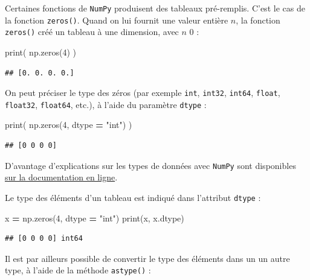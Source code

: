 \documentclass[12pt,]{book}
\newenvironment{Shaded}{\begin{snugshade}}{\end{snugshade}}
\newcommand{\DecValTok}[1]{\textcolor[rgb]{0.00,0.00,0.81}{#1}}
\newcommand{\StringTok}[1]{\textcolor[rgb]{0.31,0.60,0.02}{#1}}
\newcommand{\OperatorTok}[1]{\textcolor[rgb]{0.81,0.36,0.00}{\textbf{#1}}}
\newcommand{\BuiltInTok}[1]{#1}
\newcommand{\NormalTok}[1]{#1}
\numberwithin{equation}{section}
\numberwithin{countremarque}{section}
\begin{document}
Certaines fonctions de \texttt{NumPy} produisent des tableaux
pré-remplis. C'est le cas de la fonction \texttt{zeros()}. Quand on lui
fournit une valeur entière \(n\), la fonction \texttt{zeros()} créé un
tableau à une dimension, avec \(n\) 0 :

\begin{Shaded}
\begin{Highlighting}[]
\BuiltInTok{print}\NormalTok{( np.zeros(}\DecValTok{4}\NormalTok{) )}
\end{Highlighting}
\end{Shaded}

\begin{lstlisting}
## [0. 0. 0. 0.]
\end{lstlisting}

On peut préciser le type des zéros (par exemple \texttt{int},
\texttt{int32}, \texttt{int64}, \texttt{float}, \texttt{float32},
\texttt{float64}, etc.), à l'aide du paramètre \texttt{dtype} :

\begin{Shaded}
\begin{Highlighting}[]
\BuiltInTok{print}\NormalTok{( np.zeros(}\DecValTok{4}\NormalTok{, dtype }\OperatorTok{=} \StringTok{"int"}\NormalTok{) )}
\end{Highlighting}
\end{Shaded}

\begin{lstlisting}
## [0 0 0 0]
\end{lstlisting}

D'avantage d'explications sur les types de données avec \texttt{NumPy}
sont disponibles
\href{https://docs.scipy.org/doc/numpy-1.15.1/reference/arrays.dtypes.html}{sur
la documentation en ligne}.

Le type des éléments d'un tableau est indiqué dans l'attribut
\texttt{dtype} :

\begin{Shaded}
\begin{Highlighting}[]
\NormalTok{x }\OperatorTok{=}\NormalTok{ np.zeros(}\DecValTok{4}\NormalTok{, dtype }\OperatorTok{=} \StringTok{"int"}\NormalTok{)}
\BuiltInTok{print}\NormalTok{(x, x.dtype)}
\end{Highlighting}
\end{Shaded}

\begin{lstlisting}
## [0 0 0 0] int64
\end{lstlisting}

Il est par ailleurs possible de convertir le type des éléments dans un
un autre type, à l'aide de la méthode \texttt{astype()} :
\end{document}
